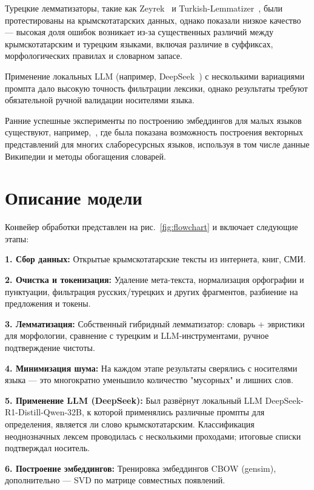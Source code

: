 \documentclass{article}
\begin{document}
Турецкие лемматизаторы, такие как Zeyrek~\cite{zeyreklem} и Turkish-Lemmatizer~\cite{turkishlemmatizer}, были протестированы на крымскотатарских данных, однако показали низкое качество — высокая доля ошибок возникает из-за существенных различий между крымскотатарским и турецким языками, включая различие в суффиксах, морфологических правилах и словарном запасе.

Применение локальных LLM (например, DeepSeek~\cite{deepseek2024}) с несколькими вариациями промпта дало высокую точность фильтрации лексики, однако результаты требуют обязательной ручной валидации носителями языка.

Ранние успешные эксперименты по построению эмбеддингов для малых языков существуют, например,~\cite{grave2018learning}, где была показана возможность построения векторных представлений для многих слаборесурсных языков, используя в том числе данные Википедии и методы обогащения словарей.

\section{Описание модели}
Конвейер обработки представлен на рис.~\ref{fig:flowchart} и включает следующие этапы:

\textbf{1. Сбор данных:}
Открытые крымскотатарские тексты из интернета, книг, СМИ.

\textbf{2. Очистка и токенизация:}
Удаление мета-текста, нормализация орфографии и пунктуации, фильтрация русских/турецких и других фрагментов, разбиение на предложения и токены.

\textbf{3. Лемматизация:}
Собственный гибридный лемматизатор: словарь + эвристики для морфологии, сравнение с турецким и LLM-инструментами, ручное подтверждение чистоты.

\textbf{4. Минимизация шума:}
На каждом этапе результаты сверялись с носителями языка — это многократно уменьшило количество "{}мусорных"{} и лишних слов.

\textbf{5. Применение LLM (DeepSeek):}
Был развёрнут локальный LLM DeepSeek-R1-Distill-Qwen-32B, к которой применялись различные промпты для определения, является ли слово крымскотатарским. Классификация неоднозначных лексем проводилась с несколькими проходами; итоговые списки подтверждал носитель.

\textbf{6. Построение эмбеддингов:}
Тренировка эмбеддингов CBOW (gensim), дополнительно — SVD по матрице совместных появлений.
\end{document}
